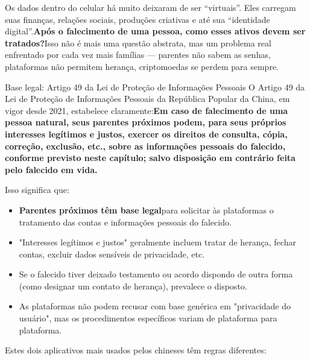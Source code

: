 
Os dados dentro do celular há muito deixaram de ser “virtuais”. Eles carregam suas finanças, relações sociais, produções criativas e até sua “identidade digital”.\textbf{Após o falecimento de uma pessoa, como esses ativos devem ser tratados?}Isso não é mais uma questão abstrata, mas um problema real enfrentado por cada vez mais famílias — parentes não sabem as senhas, plataformas não permitem herança, criptomoedas se perdem para sempre.

\begin{tcbinfo}{Base legal: Artigo 49 da Lei de Proteção de Informações Pessoais}
O Artigo 49 da Lei de Proteção de Informações Pessoais da República Popular da China, em vigor desde 2021, estabelece claramente:\textbf{Em caso de falecimento de uma pessoa natural, seus parentes próximos podem, para seus próprios interesses legítimos e justos, exercer os direitos de consulta, cópia, correção, exclusão, etc., sobre as informações pessoais do falecido, conforme previsto neste capítulo; salvo disposição em contrário feita pelo falecido em vida.}

Isso significa que:

\begin{itemize}
  \item \textbf{Parentes próximos têm base legal}para solicitar às plataformas o tratamento das contas e informações pessoais do falecido.
  \item "Interesses legítimos e justos" geralmente incluem tratar de herança, fechar contas, excluir dados sensíveis de privacidade, etc.
  \item Se o falecido tiver deixado testamento ou acordo dispondo de outra forma (como designar um contato de herança), prevalece o disposto.
  \item As plataformas não podem recusar com base genérica em "privacidade do usuário", mas os procedimentos específicos variam de plataforma para plataforma.
\end{itemize}

\end{tcbinfo}


Estes dois aplicativos mais usados pelos chineses têm regras diferentes:

